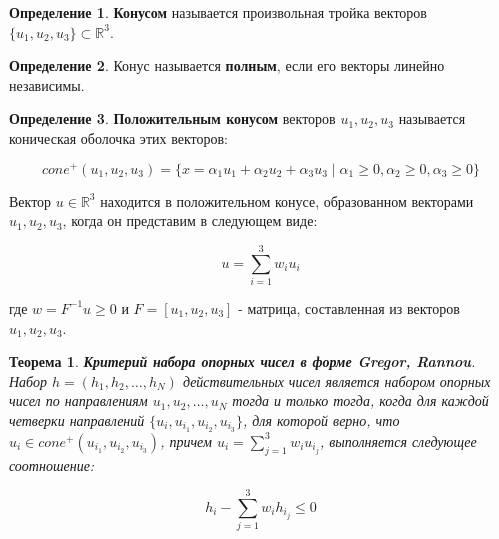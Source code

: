 \documentclass[a4paper, 12pt, titlepage]{article}
\theoremstyle{definition}
\newtheorem{SmartDefinition}{Определение}
\theoremstyle{plain}
\newtheorem{SmartTheorem}{Теорема}
\theoremstyle{plain}
\begin{document}
\begin{SmartDefinition}
 \label{def:cone}
 \textbf{Конусом} называется произвольная тройка векторов
 $\{u_{1}, u_{2}, u_{3}\} \subset \mathbb{R}^{3}$.
\end{SmartDefinition}

\begin{SmartDefinition}
 \label{def:full-cone}
 Конус называется \textbf{полным}, если его векторы линейно независимы.
\end{SmartDefinition}

\begin{SmartDefinition}
 \label{def:full-positive-cone}
 \textbf{Положительным конусом} векторов $u_{1}, u_{2}, u_{3}$ называется
 коническая оболочка этих векторов:

 \begin{equation}
  cone^{+}(u_{1}, u_{2}, u_{3}) =
  \{x = \alpha_{1} u_{1} + \alpha_{2} u_{2} + \alpha_{3} u_{3}
  \; | \; \alpha_{1} \geq 0, \alpha_{2} \geq 0, \alpha_{3} \geq 0\}
 \end{equation}
\end{SmartDefinition}

Вектор $u \in \mathbb{R}^{3}$ находится в положительном конусе, образованном
векторами $u_{1}, u_{2}, u_{3}$, когда он представим в следующем виде:

\begin{equation}
 u = \sum \limits_{i = 1}^{3} w_{i} u_{i}
\end{equation}

где $w = F^{-1} u \geq 0$ и $F = [u_{1}, u_{2}, u_{3}]$ - матрица, составленная
из векторов $u_{1}, u_{2}, u_{3}$.

\begin{SmartTheorem}
 \label{thm:criterion-gregor-rannou}
 \textbf{Критерий набора опорных чисел в форме Gregor, Rannou}.
 Набор $h = (h_{1}, h_{2}, \ldots, h_{N})$ действительных чисел является набором
 опорных чисел по направлениям $u_{1}, u_{2}, \ldots, u_{N}$ тогда и только
 тогда, когда для каждой четверки направлений
 $\{u_{i}, u_{i_{1}}, u_{i_{2}}, u_{i_{3}}\}$,
 для которой верно, что $u_{i} \in cone^{+}(u_{i_{1}}, u_{i_{2}}, u_{i_{3}})$,
 причем $u_{i} = \sum \limits_{j = 1}^{3} w_{i} u_{i_{j}}$, выполняется
 следующее соотношение:

 \begin{equation}
  \label{thm:criterion-gregor-rannou:condition}
  h_{i} - \sum \limits_{j = 1}^{3} w_{i} h_{i_{j}} \leq 0
 \end{equation}
\end{SmartTheorem}
\end{document}
